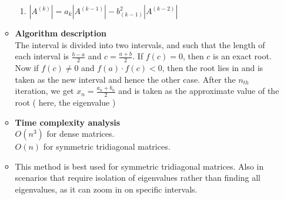 \documentclass[report,12pt,onecolumn]{IEEEtran}
\theoremstyle{remark}
\begin{document}
\begin{itemize}
\begin{itemize}
\begin{enumerate}
					\item $|A^{(k)}| = a_k |A^{(k-1)}| - b^2_{(k-1)} |A^{(k-2)}|$
				\end{enumerate}
			\item \textbf{Algorithm description} \\
				The interval  is divided into two intervals,  and  such that the length of each interval is $\frac{b-a}{2}$ and $c = \frac{a+b}{2}$. If $f(c) = 0 $, then $c$ is an exact root. \\
				Now if $f(c) \neq 0$ and $f(a) \cdot f(c) < 0$, then the root lies in  and is taken as the new interval and hence the other case. After the $n_{th}$ iteration, we get $x_n = \frac{a_n + b_n}{2}$ and is taken as the approximate value of the root ( here, the eigenvalue )
			\item \textbf{Time complexity analysis} \\
				$O(n^3)$ for dense matrices. \\
				$O(n)$ for symmetric tridiagonal matrices.
			\item This method is best used for symmetric tridiagonal matrices. Also in scenarios that require isolation of eigenvalues rather than finding all eigenvalues, as it can zoom in on specific intervals.
		\end{itemize}

\end{itemize}
\end{document}

